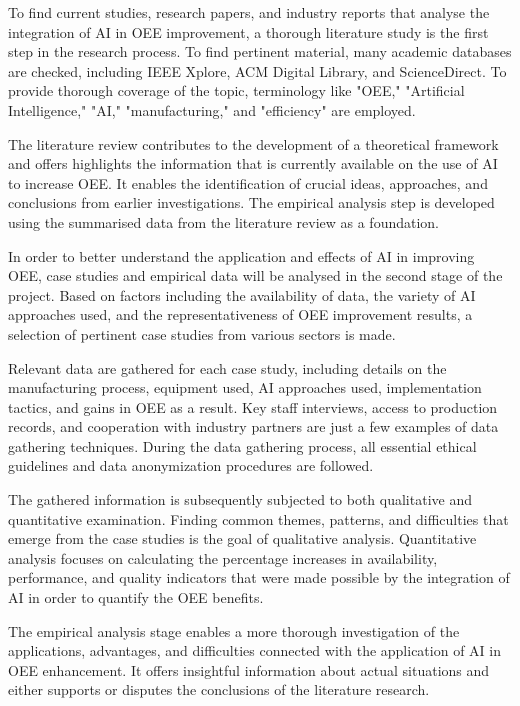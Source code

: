 \documentclass[12pt]{article}
\begin{document}
To find current studies, research papers, and industry reports that analyse the integration of AI in OEE improvement, a thorough literature study is the first step in the research process. To find pertinent material, many academic databases are checked, including IEEE Xplore, ACM Digital Library, and ScienceDirect. To provide thorough coverage of the topic, terminology like "OEE," "Artificial Intelligence," "AI," "manufacturing," and "efficiency" are employed.


The literature review contributes to the development of a theoretical framework and offers highlights the information that is currently available on the use of AI to increase OEE. It enables the identification of crucial ideas, approaches, and conclusions from earlier investigations. The empirical analysis step is developed using the summarised data from the literature review as a foundation.

In order to better understand the application and effects of AI in improving OEE, case studies and empirical data will be analysed in the second stage of the project. Based on factors including the availability of data, the variety of AI approaches used, and the representativeness of OEE improvement results, a selection of pertinent case studies from various sectors is made.


Relevant data are gathered for each case study, including details on the manufacturing process, equipment used, AI approaches used, implementation tactics, and gains in OEE as a result. Key staff interviews, access to production records, and cooperation with industry partners are just a few examples of data gathering techniques. During the data gathering process, all essential ethical guidelines and data anonymization procedures are followed.

The gathered information is subsequently subjected to both qualitative and quantitative examination. Finding common themes, patterns, and difficulties that emerge from the case studies is the goal of qualitative analysis. Quantitative analysis focuses on calculating the percentage increases in availability, performance, and quality indicators that were made possible by the integration of AI in order to quantify the OEE benefits.


The empirical analysis stage enables a more thorough investigation of the applications, advantages, and difficulties connected with the application of AI in OEE enhancement. It offers insightful information about actual situations and either supports or disputes the conclusions of the literature research.
\end{document}
